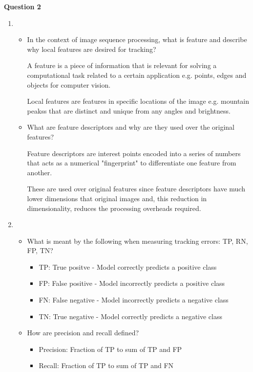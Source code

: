 \documentclass{article}
\begin{document}
    \textbf{Question 2}
    \begin{enumerate}
        \item \begin{itemize}
            \item  In the context of image sequence processing, what is feature and describe why local features are 
            desired for tracking?

            A feature is a piece of information that is relevant for solving a
            computational task related to a certain application e.g. points,
            edges and objects for computer vision. 

            Local features are features in specific locations of the image e.g.
            mountain peakss that are distinct and unique from any angles and brightness.

            \item What are feature descriptors and why are they used over the original features?
            
            Feature descriptors are interest points encoded into a series of
            numbers that acts as a numerical "fingerprint" to differentiate one
            feature from another.

            These are used over original features since feature descriptors have
            much lower dimensions that original images and, this reduction in
            dimensionality, reduces the processing overheads required.
        \end{itemize}

        \item \begin{itemize}
            \item What is meant by the following when measuring tracking errors: TP, RN, FP, TN?
            \begin{itemize}
                \item TP: True positve - Model correctly predicts a positive class 
                \item FP: False positive - Model incorrectly predicts a positive
                class 
                \item FN: False negative - Model incorrectly predicts a negative
                class  
                \item TN: True negative - Model correctly predicts a negative class 
            \end{itemize}

            \item How are precision and recall defined?
            \begin{itemize}
                \item Precision: Fraction of TP to sum of TP and FP
                \item Recall: Fraction of TP to sum of TP and FN
            \end{itemize}
        \end{itemize}
        
    \end{enumerate}


    
\end{document}
